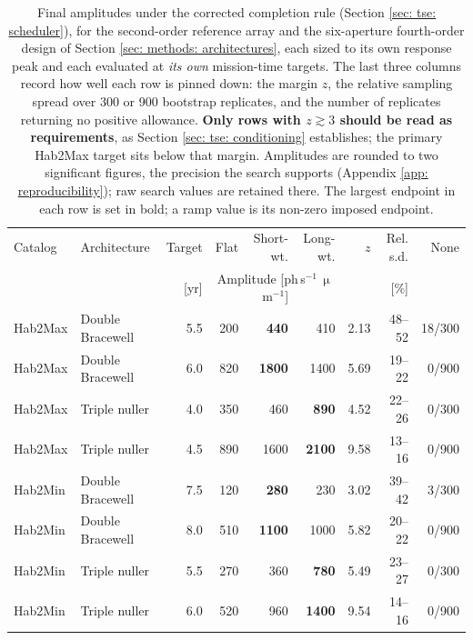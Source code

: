 \documentclass[12pt,a4paper]{article}
\numberwithin{equation}{section}
\numberwithin{figure}{section}
\numberwithin{table}{section}
\begin{document}
\begin{table}[htbp]
\centering
\setlength{\tabcolsep}{4pt}
\begin{tabular}{@{}llrrrrrrr@{}}
\toprule
Catalog & Architecture & Target & Flat & Short-wt. & Long-wt. & $z$ & Rel. s.d. & None \\
        &              & [yr]   & \multicolumn{3}{c}{Amplitude [ph\,s$^{-1}$\,$\upmu$m$^{-1}$]} & & [\%] & \\
\midrule
Hab2Max & Double Bracewell & 5.5 & 200  & \textbf{440}  & 410  & 2.13 & 48--52 & 18/300 \\
Hab2Max & Double Bracewell & 6.0 & 820  & \textbf{1800} & 1400 & 5.69 & 19--22 & 0/900 \\
Hab2Max & Triple nuller    & 4.0 & 350  & 460  & \textbf{890}  & 4.52 & 22--26 & 0/300 \\
Hab2Max & Triple nuller    & 4.5 & 890  & 1600 & \textbf{2100} & 9.58 & 13--16 & 0/900 \\
\addlinespace
Hab2Min & Double Bracewell & 7.5 & 120  & \textbf{280}  & 230  & 3.02 & 39--42 & 3/300 \\
Hab2Min & Double Bracewell & 8.0 & 510  & \textbf{1100} & 1000 & 5.82 & 20--22 & 0/900 \\
Hab2Min & Triple nuller    & 5.5 & 270  & 360  & \textbf{780}  & 5.49 & 23--27 & 0/300 \\
Hab2Min & Triple nuller    & 6.0 & 520  & 960  & \textbf{1400} & 9.54 & 14--16 & 0/900 \\
\bottomrule
\end{tabular}
\caption{Final amplitudes under the corrected completion rule (Section \ref{sec: tse: scheduler}), for the second-order reference array and the six-aperture fourth-order design of Section \ref{sec: methods: architectures}, each sized to its own response peak and each evaluated at \emph{its own} mission-time targets. The last three columns record how well each row is pinned down: the margin $z$, the relative sampling spread over 300 or 900 bootstrap replicates, and the number of replicates returning no positive allowance. \textbf{Only rows with $z \gtrsim 3$ should be read as requirements}, as Section \ref{sec: tse: conditioning} establishes; the primary Hab2Max target sits below that margin. Amplitudes are rounded to two significant figures, the precision the search supports (Appendix \ref{app: reproducibility}); raw search values are retained there. The largest endpoint in each row is set in bold; a ramp value is its non-zero imposed endpoint.}
\label{tab: budget shapes}
\end{table}
\end{document}

